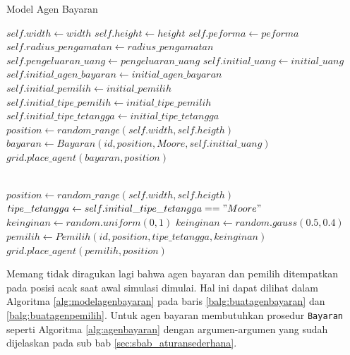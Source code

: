 \begin{algorithm}[H]
	\caption{Model Agen Bayaran}\label{alg:modelagenbayaran}
	\begin{algorithmic}[1]
			\State $self.width \gets width$
			\State $self.height \gets height$
			\State $self.peforma \gets peforma$
			\State $self.radius\_pengamatan \gets radius\_pengamatan$
			\State $self.pengeluaran\_uang \gets pengeluaran\_uang$
			\State $self.initial\_uang \gets initial\_uang$
			\State $self.initial\_agen\_bayaran \gets initial\_agen\_bayaran$
			\State $self.initial\_pemilih \gets initial\_pemilih$
			\State $self.initial\_tipe\_pemilih \gets initial\_tipe\_pemilih$
			\State $self.initial\_tipe\_tetangga \gets initial\_tipe\_tetangga$
			\\ 
			\label{balg:buatagenbayaran}
				\State $position \gets random\_range(self.width, self.heigth)$
				\State $bayaran \gets Bayaran(id,position,Moore,self.initial\_uang)$
				\State $grid.place\_agent(bayaran, position)$
			\EndFor

			\\ 
			\label{balg:buatagenpemilih}
				\State $position \gets random\_range(self.width, self.heigth)$\label{balg:posisiacakpemilih}
				\State $tipe\_tetangga \gets self.initial\_tipe\_tetangga == "Moore"$\label{balg:tipetetangga}
				\\
				\label{balg:pemilihankeinginan}
					\State $keinginan \gets random.uniform(0, 1)$
				\Else
					\State $keinginan \gets random.gauss(0.5, 0.4)$
				\EndIf
				\\
				\State $pemilih \gets Pemilih(id, position, tipe\_tetangga, keinginan)$
				\State $grid.place\_agent(pemilih, position)$
			\EndFor
		\EndProcedure
	\end{algorithmic}
\end{algorithm}

Memang tidak diragukan lagi bahwa agen bayaran dan pemilih ditempatkan pada posisi acak saat awal simulasi dimulai. Hal ini dapat dilihat dalam Algoritma \ref{alg:modelagenbayaran} pada baris \ref{balg:buatagenbayaran} dan \ref{balg:buatagenpemilih}. Untuk agen bayaran membutuhkan prosedur \texttt{Bayaran} seperti Algoritma \ref{alg:agenbayaran} dengan argumen-argumen yang sudah dijelaskan pada sub bab \ref{sec:sbab_aturansederhana}.

